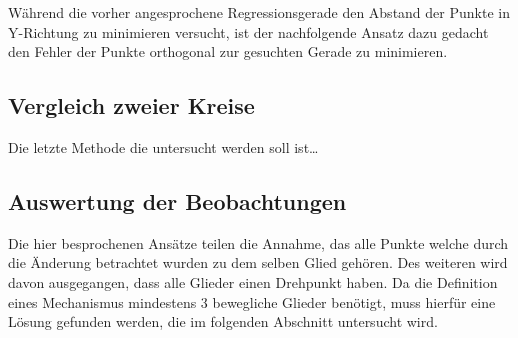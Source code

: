 Während die vorher angesprochene Regressionsgerade den Abstand der Punkte in Y-Richtung zu minimieren versucht, ist der nachfolgende Ansatz dazu gedacht den Fehler der Punkte orthogonal zur gesuchten Gerade zu minimieren.



\subsection{Vergleich zweier Kreise}

Die letzte Methode die untersucht werden soll ist\dots

\subsection{Auswertung der Beobachtungen}


Die hier besprochenen Ansätze teilen die Annahme, das alle Punkte welche durch die Änderung betrachtet wurden zu dem selben Glied gehören.
Des weiteren wird davon ausgegangen, dass alle Glieder einen Drehpunkt haben.
Da die Definition eines Mechanismus mindestens 3 bewegliche Glieder benötigt, muss hierfür eine Lösung gefunden werden, die im folgenden Abschnitt untersucht wird.

